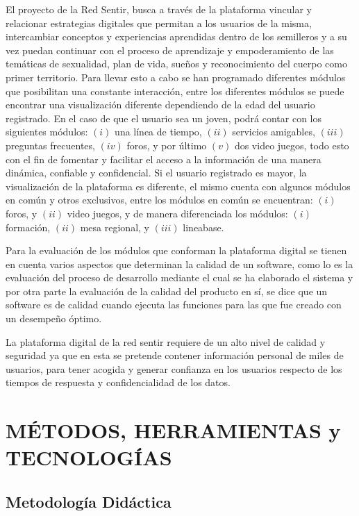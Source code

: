 \documentclass[journal,transmag]{IEEEtran}
\begin{document}
El proyecto de la Red Sentir, busca a través de la plataforma vincular y relacionar estrategias digitales que permitan a los usuarios de la misma, intercambiar conceptos y experiencias aprendidas dentro de los semilleros y a su vez puedan continuar con el proceso de aprendizaje y empoderamiento de las temáticas de sexualidad, plan de vida, sueños y reconocimiento del cuerpo como primer territorio. Para llevar esto a cabo se han programado diferentes módulos que posibilitan una constante interacción, entre los diferentes módulos se puede encontrar una visualización diferente dependiendo de la edad del usuario registrado. 
En el caso de que el usuario sea un joven, podrá contar con los siguientes módulos: $(i)$ una línea de tiempo, $(ii)$ servicios amigables, $(iii)$ preguntas frecuentes, $(iv)$ foros, y por último $(v)$ dos video juegos, todo esto con el fin de fomentar y facilitar el acceso a la información de una manera dinámica, confiable y confidencial. Si el usuario registrado es mayor, la visualización de la plataforma es diferente, el mismo cuenta con algunos módulos en común y otros exclusivos, entre los módulos en común se encuentran: $(i)$ foros, y $(ii)$ video juegos, y de manera diferenciada los módulos:  $(i)$ formación, $(ii)$ mesa regional, y $(iii)$ lineabase.

Para la evaluación de los módulos que conforman la plataforma digital se tienen en cuenta varios aspectos que determinan la calidad de un software, como lo es la evaluación del proceso de desarrollo mediante el cual se ha elaborado el sistema y por otra parte la evaluación de la calidad del producto en sí, se dice que un software es de calidad cuando ejecuta las funciones para las que fue creado con un desempeño óptimo.

La plataforma digital de la red sentir requiere de un alto nivel de calidad y seguridad ya que en esta se pretende contener información personal de miles de usuarios, para tener acogida y generar confianza en los usuarios respecto de los tiempos de respuesta y confidencialidad de los datos.

\section{MÉTODOS, HERRAMIENTAS y TECNOLOGÍAS}\label{sec:herramientas}

\subsection{Metodología Didáctica}
\end{document}
